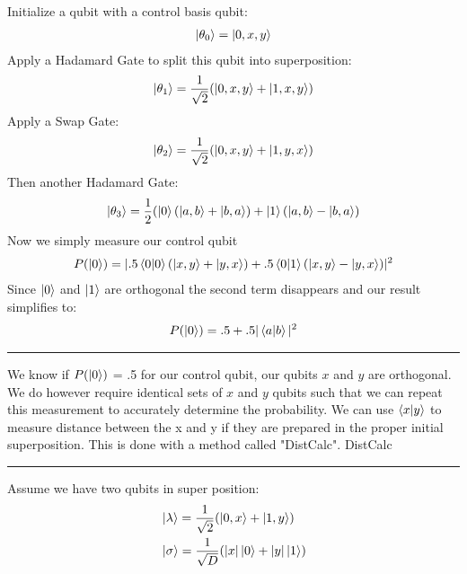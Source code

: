 \documentclass[conference]{IEEEtran}
\begin{document}
   Initialize a qubit with a control basis qubit: \newline 
 \begin{align*}
 \ket{\theta_0} = \ket{0,x,y} 
 \end{align*} 
   Apply a Hadamard Gate to split this qubit into superposition: \newline
 \begin{align*}
 \ket{\theta_1} = \frac{1}{\sqrt{2}}(\ket{0,x,y}+ \ket{1,x,y}) 
 \end{align*} 
   Apply a Swap Gate: \newline 
 \begin{align*} 
 \ket{\theta_2} = \frac{1}{\sqrt{2}}(\ket{0,x,y}+ \ket{1,y,x}) 
 \end{align*} 
   Then another Hadamard Gate: \newline 
 \begin{align*}
 \ket{\theta_3} = \frac{1}{2}(\ket{0}(\ket{a,b}+\ket{b,a}) + \ket{1}(\ket{a,b}-\ket{b,a}) 
 \end{align*} 
 Now we simply measure our control qubit \newline
 \begin{align*}
 P(\ket{0}) =|.5 \bra{0}\ket{0}(\ket{x,y} + \ket{y,x}) + .5\bra{0}\ket{1}(\ket{x,y}-\ket{y,x})|^2
 \end{align*}
 Since $\ket{0}$ and $\ket{1}$ are orthogonal the second term disappears and our result simplifies to: \newline
 \begin{align*}
 P(\ket{0}) = .5 + .5|\bra{a}\ket{b}|^2
 \end{align*} \newline
\noindent\rule{\columnwidth}{1pt}
\indent We know if $P(\ket{0})$ = .5 for our control qubit, our qubits $x$ and $y$ are orthogonal. We do however require identical sets of $x$ and $y$ qubits such that we can repeat this measurement to accurately determine the probability. We can use $\bra{x}\ket{y}$ to measure distance between the x and y if they are prepared in the proper initial superposition. This is done with a method called "DistCalc".  \newline
\newline
{\large DistCalc} \newline
\noindent\rule{\columnwidth}{1pt}
Assume we have two qubits in super position:
\begin{align*}
& \ket{\lambda} = \frac{1}{\sqrt{2}}(\ket{0,x} + \ket{1,y}) \\
& \ket{\sigma} = \frac{1}{\sqrt{D}}(|x|\ket{0} + |y|\ket{1})
\end{align*} 
\end{document}
